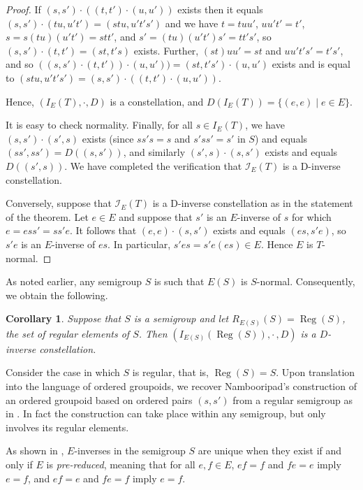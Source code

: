\documentclass[12pt]{amsart}
\newtheorem{cor}[thm]{Corollary}
\theoremstyle{definition}
\DeclareMathOperator{\Reg}{Reg}
\begin{document}
\begin{proof}
If $(s,s')\cdot((t,t')\cdot (u,u'))$ exists then it equals $(s,s')\cdot(tu,u't')=(stu,u't's')$ and we have $t=tuu'$, $uu't'=t'$, $s=s(tu)(u't')=stt'$, and $s'=(tu)(u't')s'=tt's'$, so $(s,s')\cdot (t,t')=(st,t's)$ exists. Further,  $(st)uu'=st$ and $uu't's'=t's'$, and so $((s,s')\cdot(t,t'))\cdot (u,u'))=(st,t's')\cdot (u,u')$ exists and is equal to $(stu,u't's')=(s,s')\cdot((t,t')\cdot (u,u'))$.

Hence, $(I_E(T),\cdot,D)$ is a constellation, and $D(I_E(T))=\{(e,e)\mid e\in E\}$.

 It is easy to check normality. Finally, for all $s\in I_E(T)$, we have $(s,s')\cdot (s',s)$ exists (since $ss's=s$ and $s'ss'=s'$ in $S$) and equals $(ss',ss')=D((s,s'))$, and similarly $(s',s)\cdot (s,s')$ exists and equals $D((s',s))$.  We have completed the verification that $\mathcal{I}_E(T)$ is a D-inverse constellation.

Conversely, suppose that $\mathcal{I}_E(T)$ is a D-inverse constellation as in the statement of the theorem. Let $e\in E$ and suppose that $s'$ is an $E$-inverse of $s$ for which $e=ess'=ss'e$.  It follows that $(e,e)\cdot (s,s')$ exists and equals $(es,s'e)$, so $s'e$ is an $E$-inverse of $es$.  In particular, $s'es=s'e(es)\in E$.  Hence $E$ is $T$-normal.  
\end{proof}

As noted earlier, any semigroup $S$ is such that $E(S)$ is $S$-normal.  Consequently, we obtain the following.

\begin{cor}
Suppose that $S$ is a semigroup and let $R_{E(S)}(S)=\Reg(S)$, the set of regular elements of $S$.  Then  $(I_{E(S)}(\Reg(S)),\cdot\, ,D)$ is a $D$-inverse constellation.
\end{cor}

Consider the  case in which $S$ is regular,  that is, $\Reg(S)=S$. Upon translation into the language of ordered groupoids, we recover Nambooripad's construction of an ordered groupoid based on ordered pairs $(s,s')$ from a regular semigroup as in \cite{nambooripad}.  In fact the construction can take place within any semigroup, but only involves its regular elements.

As shown in \cite{Dsemigen}, $E$-inverses in the semigroup $S$ are unique when they exist if and only if $E$ is {\em pre-reduced}, meaning that for all $e,f\in E$, $ef=f$ and $fe=e$ imply $e=f$, and $ef=e$ and $fe=f$ imply $e=f$.  
\end{document}
